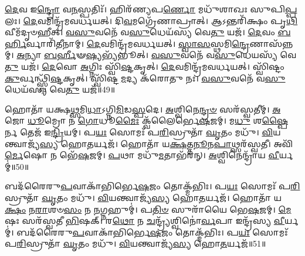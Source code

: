 \-\ul{𑌦𑍇}\-𑌵 𑌇\-\ul{𑌨𑍍𑌦𑍍𑌰𑍋} 𑌵\-\ul{𑌨}\-𑌸𑍍𑌪𑌤𑌿𑌃᳴।
𑌹𑌿𑌰᳴𑌣𑍍𑌯𑌪\-\ul{𑌰𑍍𑌣𑍋} 𑌮𑌧𑍁᳴𑌶𑌾𑌖𑌃 𑌸𑍁𑌪𑌿\-\ul{𑌪𑍍𑌪}\-𑌲𑌃।
\-\ul{𑌦𑍇}\-𑌵𑌮𑌿𑌨𑍍𑌦𑍍𑌰᳴𑌮𑌵𑌰𑍍𑌧𑌯𑌤𑍍।
𑌦𑌿\-\ul{𑌵}\-𑌮𑌗𑍍𑌰𑍇᳴𑌣𑌾𑌪𑍍𑌰𑌾𑌤𑍍।
𑌆𑌽𑌨𑍍𑌤𑌰𑌿᳴𑌕𑍍𑌷𑌂 𑌪𑍃\-\ul{𑌥𑌿}\-𑌵𑍀𑌮᳴𑌦𑍃𑍞𑌹𑍀𑌤𑍍।
\-\ul{𑌵}\-\-\ul{𑌸𑍁}\-𑌵𑌨𑍇᳴ 𑌵\-\ul{𑌸𑍁}\-𑌧𑍇𑌯᳴𑌸𑍍𑌯 𑌵𑍇\-\ul{𑌤𑍁} 𑌯𑌜᳴।
\-\ul{𑌦𑍇}\-𑌵𑌂 \ul{𑌬}\-\-\ul{𑌰𑍍}\-𑌹𑌿𑌰𑍍𑌵𑌾𑌰𑌿᳴𑌤𑍀𑌨𑌾𑌮𑍍।
\-\ul{𑌦𑍇}\-𑌵𑌮𑌿𑌨𑍍𑌦𑍍𑌰᳴𑌮𑌵𑌰𑍍𑌧𑌯𑌤𑍍।
\-\ul{𑌸𑍍𑌵𑌾}\-\-\ul{𑌸}\-𑌸𑍍𑌥𑌮𑌿\-\ul{𑌨𑍍𑌦𑍍𑌰𑍇}\-𑌣𑌾\-𑌸᳴𑌨𑍍𑌨𑌮𑍍।
\-\ul{𑌅}\-𑌨𑍍𑌯𑌾 \ul{𑌬}\-\-\ul{𑌰𑍍}\-𑌹𑍀𑍟\-\ul{𑌷𑍍𑌯}\-𑌭𑍍𑌯᳴\-𑌭𑍂𑌤𑍍।
\-\ul{𑌵}\-\-\ul{𑌸𑍁}\-𑌵𑌨𑍇᳴ 𑌵\-\ul{𑌸𑍁}\-𑌧𑍇𑌯𑌸𑍍𑌯᳴ 𑌵𑍇\-\ul{𑌤𑍁} 𑌯𑌜᳴।
\-\ul{𑌦𑍇}\-𑌵𑍋 \ul{𑌅}\-𑌗𑍍𑌨𑌿𑌃 𑌸𑍍𑌵𑌿᳴\-\ul{𑌷𑍍𑌟}\-\-𑌕𑍃𑌤𑍍।
\-\ul{𑌦𑍇}\-𑌵𑌮𑌿𑌨𑍍𑌦𑍍𑌰᳴𑌮𑌵𑌰𑍍𑌧𑌯𑌤𑍍।
𑌸𑍍𑌵𑌿᳴𑌷𑍍𑌟𑌂 \ul{𑌕𑍁}\-𑌰𑍍𑌵𑌨𑍍𑌥𑍍𑌸𑍍𑌵𑌿᳴\-\ul{𑌷𑍍𑌟}\-\-𑌕𑍃𑌤𑍍।
𑌸𑍍𑌵𑌿᳴𑌷𑍍𑌟\-\ul{𑌮}\-𑌦𑍍𑌯 𑌕᳴𑌰𑍋𑌤𑍁 𑌨𑌃।
\-\ul{𑌵}\-\-\ul{𑌸𑍁}\-𑌵𑌨𑍇᳴ 𑌵\-\ul{𑌸𑍁}\-𑌧𑍇𑌯᳴𑌸𑍍𑌯 𑌵𑍇\-\ul{𑌤𑍁} 𑌯𑌜᳴॥49॥

𑌹𑍋𑌤𑌾᳴ 𑌯𑌕𑍍𑌷\-\ul{𑌥𑍍𑌸}\-𑌮𑌿\-\ul{𑌧𑌾}\-\-𑌽𑌗𑍍𑌨𑌿\-\ul{𑌮𑌿}\-𑌡\-\ul{𑌸𑍍𑌪}\-𑌦𑍇।
\-\ul{𑌅}\-𑌶𑍍𑌵𑌿𑌨𑍇\-\ul{𑌨𑍍𑌦𑍍𑌰}\-\-\ul{𑍞} 𑌸𑌰᳴𑌸𑍍𑌵𑌤𑍀𑌮𑍍।
\-\ul{𑌅}\-𑌜𑍋 \ul{𑌧𑍂}\-𑌮𑍍𑌰𑍋 𑌨 \ul{𑌗𑍋}\-𑌧𑍂\-\ul{𑌮𑍈𑌃} 𑌕𑍍𑌵᳴𑌲𑍈𑌰𑍍𑌭𑍇\-\ul{𑌷}\-𑌜𑌮𑍍।
𑌮\-\ul{𑌧𑍁} 𑌶\-\ul{𑌷𑍍𑌪𑍈}\-𑌰𑍍𑌨 𑌤𑍇𑌜᳴ 𑌇\-\ul{𑌨𑍍𑌦𑍍𑌰𑌿}\-𑌯𑌮𑍍।
𑌪\-\ul{𑌯𑌃} 𑌸𑍋𑌮𑌃᳴ 𑌪\-\ul{𑌰𑌿}\-𑌸𑍍𑌰𑍁𑌤𑌾᳴ \ul{𑌘𑍃}\-𑌤𑌂 𑌮𑌧𑍁᳴।
\-\ul{𑌵𑌿}\-𑌯𑌨𑍍𑌤𑍍𑌵𑌾𑌜𑍍𑌯᳴\-\ul{𑌸𑍍𑌯} 𑌹𑍋\-\ul{𑌤}\-𑌰𑍍𑌯𑌜᳴।
𑌹𑍋𑌤𑌾᳴ 𑌯\-\ul{𑌕𑍍𑌷}\-𑌤𑍍𑌤\-\ul{𑌨𑍂}\-𑌨\-\ul{𑌪𑌾}\-𑌥𑍍𑌸𑌰᳴𑌸𑍍𑌵𑌤𑍀।
𑌅𑌵𑌿᳴\-\ul{𑌰𑍍𑌮𑍇}\-𑌷𑍋 𑌨 𑌭𑍇᳴\-\ul{𑌷}\-𑌜𑌮𑍍।
\-\ul{𑌪}\-𑌥𑌾 𑌮𑌧𑍁᳴\-\ul{𑌮}\-𑌤𑌾𑌭᳴𑌰𑌨𑍍।
\-\ul{𑌅}\-𑌶𑍍𑌵𑌿𑌨𑍇𑌨𑍍𑌦𑍍𑌰𑌾᳴𑌯 \ul{𑌵𑍀}\-𑌰𑍍𑌯𑌮𑍍॑॥50॥

𑌬𑌦᳴𑌰𑍈𑌰𑍁\-\ul{𑌪}\-𑌵𑌾𑌕𑌾᳴𑌭𑌿𑌰𑍍𑌭𑍇\-\ul{𑌷}\-𑌜𑌂 𑌤𑍋𑌕𑍍𑌮᳴𑌭𑌿𑌃।
𑌪\-\ul{𑌯𑌃} 𑌸𑍋𑌮𑌃᳴ 𑌪\-\ul{𑌰𑌿}\-𑌸𑍍𑌰𑍁𑌤𑌾᳴ \ul{𑌘𑍃}\-𑌤𑌂 𑌮𑌧𑍁᳴।
\-\ul{𑌵𑌿}\-𑌯𑌨𑍍𑌤𑍍𑌵𑌾𑌜𑍍𑌯᳴\-\ul{𑌸𑍍𑌯} 𑌹𑍋\-\ul{𑌤}\-𑌰𑍍𑌯𑌜᳴।
𑌹𑍋𑌤𑌾᳴ 𑌯\-\ul{𑌕𑍍𑌷𑌂} 𑌨\-\ul{𑌰𑌾}\-𑌶𑍞\-\ul{𑌸𑌂} 𑌨 \ul{𑌨}\-𑌗𑍍𑌨𑌹𑍁𑌮𑍍॑।
𑌪\-\ul{𑌤𑌿}\-\-\ul{𑍞} 𑌸𑍁𑌰𑌾᳴𑌯𑍈 𑌭𑍇\-\ul{𑌷}\-𑌜𑌮𑍍।
\-\ul{𑌮𑍇}\-𑌷𑌃 𑌸𑌰᳴𑌸𑍍𑌵𑌤𑍀 \ul{𑌭𑌿}\-𑌷𑌕𑍍।
𑌰\-\ul{𑌥𑍋} 𑌨 \ul{𑌚}\-𑌨𑍍𑌦𑍍𑌰𑍍𑌯᳴𑌶𑍍𑌵𑌿𑌨𑍋॑\-\ul{𑌰𑍍𑌵}\-𑌪𑌾 𑌇𑌨𑍍𑌦𑍍𑌰᳴𑌸𑍍𑌯 \ul{𑌵𑍀}\-𑌰𑍍𑌯𑌮𑍍॑।
𑌬𑌦᳴𑌰𑍈𑌰𑍁\-\ul{𑌪}\-𑌵𑌾𑌕𑌾᳴𑌭𑌿𑌰𑍍𑌭𑍇\-\ul{𑌷}\-𑌜𑌂 𑌤𑍋𑌕𑍍𑌮᳴𑌭𑌿𑌃।
𑌪\-\ul{𑌯𑌃} 𑌸𑍋𑌮𑌃᳴ 𑌪\-\ul{𑌰𑌿}\-𑌸𑍍𑌰𑍁𑌤𑌾᳴ \ul{𑌘𑍃}\-𑌤𑌂 𑌮𑌧𑍁᳴।
\-\ul{𑌵𑌿}\-𑌯𑌨𑍍𑌤𑍍𑌵𑌾𑌜𑍍𑌯᳴\-\ul{𑌸𑍍𑌯} 𑌹𑍋\-\ul{𑌤}\-𑌰𑍍𑌯𑌜᳴॥51॥

